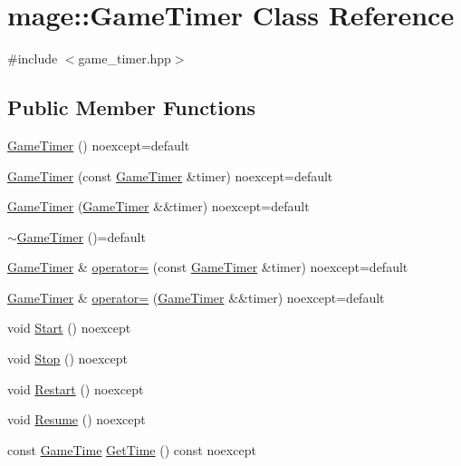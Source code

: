 \hypertarget{classmage_1_1_game_timer}{}\section{mage\+:\+:Game\+Timer Class Reference}
\label{classmage_1_1_game_timer}


{\ttfamily \#include $<$game\+\_\+timer.\+hpp$>$}

\subsection*{Public Member Functions}
\begin{DoxyCompactItemize}
\item 
\hyperlink{classmage_1_1_game_timer_a171e5e335b8c2ba77ce80b64bcad9ef5}{Game\+Timer} () noexcept=default
\item 
\hyperlink{classmage_1_1_game_timer_a0c70f8245381120b6e334db078affa00}{Game\+Timer} (const \hyperlink{classmage_1_1_game_timer}{Game\+Timer} \&timer) noexcept=default
\item 
\hyperlink{classmage_1_1_game_timer_a5be12a14c07e264f402635a87b78b401}{Game\+Timer} (\hyperlink{classmage_1_1_game_timer}{Game\+Timer} \&\&timer) noexcept=default
\item 
\hyperlink{classmage_1_1_game_timer_a1ba81ccdb247f932e7a396f1ce773bbd}{$\sim$\+Game\+Timer} ()=default
\item 
\hyperlink{classmage_1_1_game_timer}{Game\+Timer} \& \hyperlink{classmage_1_1_game_timer_a9465e2d38d8810c2acb2cde2aafeaad1}{operator=} (const \hyperlink{classmage_1_1_game_timer}{Game\+Timer} \&timer) noexcept=default
\item 
\hyperlink{classmage_1_1_game_timer}{Game\+Timer} \& \hyperlink{classmage_1_1_game_timer_ae5489a5363fbf69592270a9f35f269c9}{operator=} (\hyperlink{classmage_1_1_game_timer}{Game\+Timer} \&\&timer) noexcept=default
\item 
void \hyperlink{classmage_1_1_game_timer_ab4eb362f71e15e1ca931d5bd0102db46}{Start} () noexcept
\item 
void \hyperlink{classmage_1_1_game_timer_a309768cb7a9dee1f4ac358bdba1842f4}{Stop} () noexcept
\item 
void \hyperlink{classmage_1_1_game_timer_a93108b016f2034da39e576067443d265}{Restart} () noexcept
\item 
void \hyperlink{classmage_1_1_game_timer_adbc9ce04e6c7f53f0b5ea6b5ce79a288}{Resume} () noexcept
\item 
const \hyperlink{classmage_1_1_game_time}{Game\+Time} \hyperlink{classmage_1_1_game_timer_a5883ab785122b5722ec11045e146ff18}{Get\+Time} () const noexcept
\end{DoxyCompactItemize}
